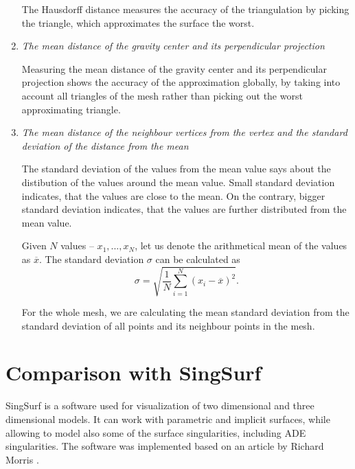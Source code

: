 \begin{enumerate}
    The Hausdorff distance measures the accuracy of the triangulation by picking the 
    triangle, which approximates the surface the worst.

    \item \textit{The mean distance of the gravity center and its perpendicular projection}
    
    Measuring the mean distance of the gravity center and its perpendicular 
    projection shows the accuracy of the approximation globally, by taking into
    account all triangles of the mesh rather than picking out the worst approximating 
    triangle.

    \item \textit{The mean distance of the neighbour vertices from the vertex and the 
    standard deviation of the distance from the mean}

    The standard deviation of the values from the mean value says about the 
    distibution of the values around the mean value. Small standard deviation indicates,
    that the values are close to the mean. On the contrary, bigger standard deviation
    indicates, that the values are further distributed from the mean value.

    \begin{definition}
        Given $N$ values -- $x_1, ..., x_N$, let us denote the arithmetical mean 
        of the values as $\overline{x}$. The standard deviation $\sigma$ can be calculated
        as
        \begin{equation}
            \sigma = \sqrt{\frac{1}{N} \sum\limits_{i=1}^{N}(x_i - \overline{x})^2}. 
        \end{equation}
    \end{definition}

    For the whole mesh, we are calculating the mean standard deviation from the 
    standard deviation of all points and its neighbour points in the mesh.
\end{enumerate}

\section{Comparison with SingSurf}
\label{sub4.2}

SingSurf \cite{morris2003client} is a software used for visualization of two dimensional
and three dimensional models. It can work with parametric and implicit surfaces, 
while allowing to model also some of the surface singularities, including
ADE singularities. The software was implemented based on an article by 
Richard Morris \cite{morris2003client}.

